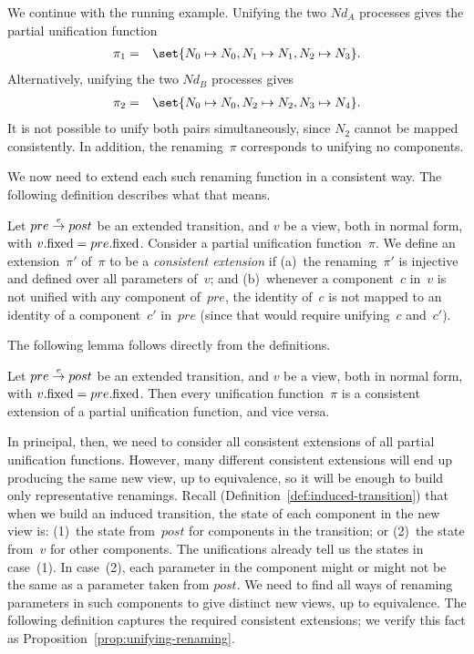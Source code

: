 
\begin{example}
We continue with the running example.  Unifying the two $Nd_A$ processes
gives the partial unification function
%
\begin{eqnarray*}
\pi_1 & = & \set{N_0 \mapsto N_0, N_1 \mapsto N_1, N_2 \mapsto N_3}.
\end{eqnarray*}
%
Alternatively, unifying the two $Nd_B$ processes gives
\begin{eqnarray*}
\pi_2 & = & \set{N_0 \mapsto N_0, N_2 \mapsto N_2, N_3 \mapsto N_4}.
\end{eqnarray*}
It is not possible to unify both pairs simultaneously, since $N_2$ cannot be
mapped consistently.  In addition, the renaming~$\pi$ corresponds to unifying
no components.
\end{example}

We now need to extend each such renaming function in a consistent way.  The
following definition describes what that means.
%
\begin{definition}
\label{def:consistent-extension}
Let $pre \stackrel{e}\rightarrow post$ be an extended transition, and $v$ be a view, both in
normal form, with $v.\mathrm{fixed} = pre.\mathrm{fixed}$.
%
Consider a partial unification function~$\pi$.  We define an extension~$\pi'$
of~$\pi$ to be a \emph{consistent extension} if (a)~the renaming~$\pi'$ is
injective and defined over all parameters of~$v$; and (b)~whenever a
component~$c$ in~$v$ is not unified with any component of~$pre$, the identity
of~$c$ is not mapped to an identity of a component~$c'$ in~$pre$ (since that
would require unifying~$c$ and~$c'$).
\end{definition}


The following lemma follows directly from the definitions.
%
\begin{lemma}
Let $pre \stackrel{e}\rightarrow post$ be an extended transition, and $v$ be a view, both in
normal form, with $v.\mathrm{fixed} = pre.\mathrm{fixed}$.  Then every unification
function~$\pi$ is a consistent extension of a partial unification function,
and vice versa.
\end{lemma}

In principal, then, we need to consider all consistent extensions of all
partial unification functions.  However, many different consistent extensions
will end up producing the same new view, up to equivalence, so it will be
enough to build only representative renamings.  Recall
(Definition~\ref{def:induced-transition}) that when we build an induced
transition, the state of each component in the new view is: (1)~the state
from~$post$ for components in the transition; or (2)~the state from~$v$ for
other components.  The unifications already tell us the states in case~(1).
In case~(2), each parameter in the component might or might not be the same as
a parameter taken from $post$.  We need to find all ways of renaming
parameters in such components to give distinct new views, up to equivalence.
The following definition captures the required consistent extensions; we
verify this fact as Proposition~\ref{prop:unifying-renaming}.

